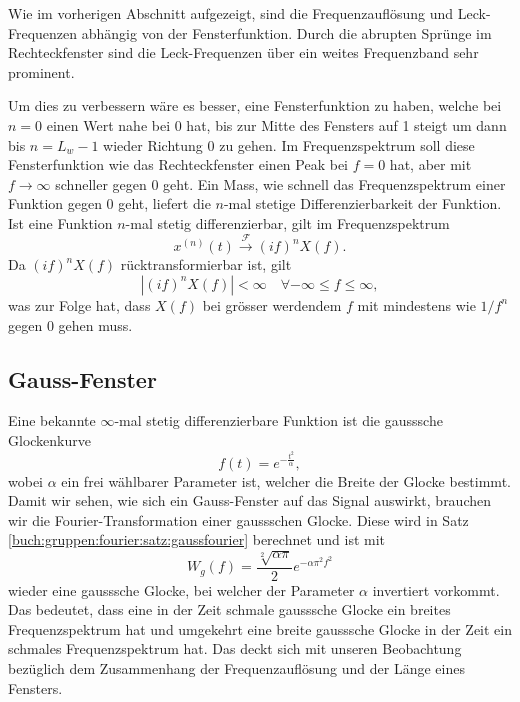 Wie im vorherigen Abschnitt aufgezeigt, sind die Frequenzauflösung und 
Leck-Frequenzen abhängig von der Fensterfunktion.
Durch die abrupten Sprünge im Rechteckfenster sind die Leck-Frequenzen 
über ein weites Frequenzband sehr prominent.

Um dies zu verbessern wäre es besser, eine Fensterfunktion zu haben,
welche bei $n = 0$ einen Wert nahe bei 0 hat,
bis zur Mitte des Fensters auf 1 steigt um dann bis $n = L_w -1$ wieder Richtung 0 zu gehen. 
Im Frequenzspektrum soll diese Fensterfunktion wie das Rechteckfenster einen 
Peak bei $f = 0$ hat, aber mit $f \rightarrow \infty$ schneller
gegen 0 geht.
Ein Mass, wie schnell das Frequenzspektrum einer Funktion gegen 0 geht, liefert
die $n$-mal stetige Differenzierbarkeit der Funktion.
Ist eine Funktion $n$-mal stetig differenzierbar, gilt im Frequenzspektrum
\begin{equation}
    x^{(n)}(t) \xrightarrow{\mathscr{F}} (i f)^n X(f).
\end{equation}
Da $(i f)^n X(f)$ rücktransformierbar ist, gilt
\begin{equation}
    |(i f)^n X(f)| < \infty \quad \forall -\infty \leq f \leq \infty,
\end{equation}
was zur Folge hat, dass $X(f)$ bei grösser werdendem $f$ mit mindestens wie $1/f^n$ gegen 
0 gehen muss.

\subsection{Gauss-Fenster}
Eine bekannte $\infty$-mal stetig differenzierbare Funktion ist die gausssche Glockenkurve
\begin{equation}
    f(t) = e^{-\frac{t^2}{\alpha}},
\end{equation}
wobei $\alpha$ ein frei wählbarer Parameter ist, welcher die Breite der Glocke 
bestimmt.
Damit wir sehen, wie sich ein Gauss-Fenster auf das Signal auswirkt, brauchen wir
%
die Fourier-Transformation einer gaussschen Glocke.
Diese wird in Satz \ref{buch:gruppen:fourier:satz:gaussfourier} berechnet und ist mit
\begin{equation}
    W_g(f) =
    \frac{\sqrt[2]{\alpha \pi}}{2} e^{-\alpha \pi^2 f^2}
\end{equation}
wieder eine gausssche Glocke, bei welcher der Parameter $\alpha$ invertiert vorkommt.
Das bedeutet, dass eine in der Zeit schmale gausssche Glocke ein breites Frequenzspektrum hat und umgekehrt eine
breite gausssche Glocke in der Zeit ein schmales Frequenzspektrum hat.
Das deckt sich mit unseren Beobachtung bezüglich dem Zusammenhang der 
Frequenzauflösung und der Länge eines Fensters.

